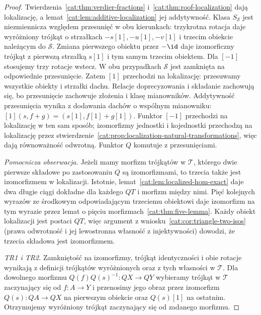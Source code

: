 \begin{proof}
Twierdzenia~\ref{cat:thm:verdier-fractions} i~\ref{cat:thm:roof-localization} dają lokalizację, a lemat~\ref{cat:lem:additive-localization} jej addytywność. Klasa $S_{\mathcal S}$ jest niezmiennicza względem przesunięć w obu kierunkach: trzykrotna rotacja daje wyróżniony trójkąt o strzałkach $-s[1],-u[1],-v[1]$ i trzecim obiekcie należącym do $\mathcal S$. Zmiana pierwszego obiektu przez $-\id$ daje izomorficzny trójkąt z pierwszą strzałką $s[1]$ i tym samym trzecim obiektem. Dla $[-1]$ stosujemy trzy rotacje wstecz. W obu przypadkach $\mathcal S$ jest zamknięta na odpowiednie przesunięcie. Zatem $[1]$ przechodzi na lokalizację: przesuwamy wszystkie obiekty i strzałki dachu. Relacje doprecyzowania i składanie zachowują się, bo przesunięcie zachowuje złożenia i klasę mianowników. Addytywność przesunięcia wynika z dodawania dachów o wspólnym mianowniku: $[1](s,f+g)=(s[1],f[1]+g[1])$. Funktor $[-1]$ przechodzi na lokalizację w ten sam sposób; izomorfizmy jednostki i kojednostki przechodzą na lokalizację przez stwierdzenie~\ref{cat:prop:localization-natural-transformations}, więc dają równoważność odwrotną. Funktor $Q$ komutuje z przesunięciami.

\emph{Pomocnicza obserwacja.} Jeżeli mamy morfizm trójkątów w $\mathcal T$, którego dwie pierwsze składowe po zastosowaniu $Q$ są izomorfizmami, to trzecia także jest izomorfizmem w lokalizacji. Istotnie, lemat~\ref{cat:lem:localized-hom-exact} daje dwa długie ciągi dokładne dla każdego $QT$ i morfizm między nimi. Pięć kolejnych wyrazów ze środkowym odpowiadającym trzeciemu obiektowi daje izomorfizm na tym wyrazie przez lemat o pięciu morfizmach~\ref{cat:thm:five-lemma}. Każdy obiekt lokalizacji jest postaci $QT$, więc argument z wniosku~\ref{cat:cor:triangle-two-isos} (prawa odwrotność i jej lewostronna własność z injektywności) dowodzi, że trzecia składowa jest izomorfizmem.

\emph{TR1 i TR2.} Zamkniętość na izomorfizmy, trójkąt identyczności i obie rotacje wynikają z definicji trójkątów wyróżnionych oraz z tych własności w $\mathcal T$. Dla dowolnego morfizmu $Q(f)Q(s)^{-1}:QX\to QY$ wybieramy trójkąt w $\mathcal T$ zaczynający się od $f:A\to Y$ i przenosimy jego obraz przez izomorfizm $Q(s):QA\to QX$ na pierwszym obiekcie oraz $Q(s)[1]$ na ostatnim. Otrzymujemy wyróżniony trójkąt zaczynający się od zadanego morfizmu.


\end{proof}
